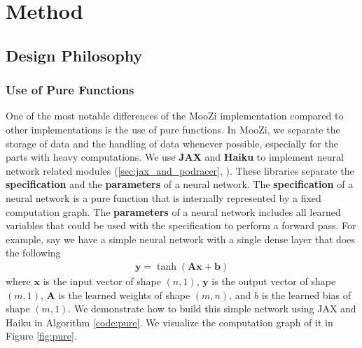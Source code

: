 \section{Method} \label{sec:method}
\subsection{Design Philosophy}

\subsubsection{Use of Pure Functions}
One of the most notable differences of the MooZi implementation compared to other implementations is the use of pure functions.
In MooZi, we separate the storage of data and the handling of data whenever possible, especially for the parts with heavy computations.
We use \textbf{JAX} and \textbf{Haiku} to implement neural network related modules (\ref{sec:jax_and_podracer}, \cite{HaikuSonnetJAX_Hennigan.Cai.ea_2020,JAXComposableTransformations_JamesBradbury.RoyFrostig.ea_2018}).
These libraries separate the \textbf{specification} and the \textbf{parameters} of a neural network.
The \textbf{specification} of a neural network is a pure function that is internally represented by a fixed computation graph.
The \textbf{parameters} of a neural network includes all learned variables that could be used with the specification to perform a forward pass.
For example, say we have a simple neural network with a single dense layer that does the following
\begin{align*}
    \mathbf{y} = \operatorname{tanh}\left( \mathbf{A}\mathbf{x} + \mathbf{b} \right)
\end{align*}
where $\mathbf{x}$ is the input vector of shape $(n, 1)$, $\mathbf{y}$ is the output vector of shape $(m, 1)$, $\mathbf{A}$ is the learned weights of shape $(m, n)$, and $b$ is the learned bias of shape $(m, 1)$.
We demonstrate how to build this simple network using JAX and Haiku in Algorithm \ref{code:pure}.
We visualize the computation graph of it in Figure \ref{fig:pure}.

